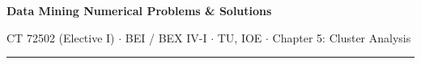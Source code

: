 \documentclass[10pt]{article}
\begin{document}
{\LARGE\bfseries Data Mining \gap\textcolor{sub}{Numerical Problems \& Solutions}}\par
{\footnotesize\color{sub} CT 72502 (Elective I) $\cdot$ BEI / BEX IV-I $\cdot$ TU, IOE $\cdot$ Chapter 5: Cluster Analysis}
\vspace{3pt}\hrule\vspace{4pt}




\end{document}
